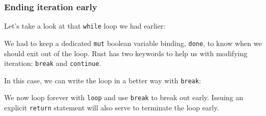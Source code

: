 \documentclass[a4paper,]{book}
\newenvironment{Shaded}{\begin{snugshade}}{\end{snugshade}}
\newcommand{\KeywordTok}[1]{\textcolor[rgb]{0.13,0.29,0.53}{\textbf{{#1}}}}
\newcommand{\DecValTok}[1]{\textcolor[rgb]{0.00,0.00,0.81}{{#1}}}
\newcommand{\ConstantTok}[1]{\textcolor[rgb]{0.00,0.00,0.00}{{#1}}}
\newcommand{\StringTok}[1]{\textcolor[rgb]{0.31,0.60,0.02}{{#1}}}
\newcommand{\PreprocessorTok}[1]{\textcolor[rgb]{0.56,0.35,0.01}{\textit{{#1}}}}
\newcommand{\NormalTok}[1]{{#1}}
\begin{document}
\subsubsection{Ending iteration early}\label{ending-iteration-early}

Let's take a look at that \texttt{while} loop we had earlier:

\begin{Shaded}
\end{Shaded}

We had to keep a dedicated \texttt{mut} boolean variable binding,
\texttt{done}, to know when we should exit out of the loop. Rust has two
keywords to help us with modifying iteration: \texttt{break} and
\texttt{continue}.

In this case, we can write the loop in a better way with \texttt{break}:

\begin{Shaded}
\end{Shaded}

We now loop forever with \texttt{loop} and use \texttt{break} to break
out early. Issuing an explicit \texttt{return} statement will also serve
to terminate the loop early.
\end{document}
